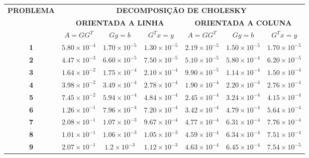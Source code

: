 \documentclass[a4paper,11pt]{article}
\begin{document}
\begin{table}[h]
\begin{tabular}{|c|c|c|c|c|c|c|}
\hline
\multirow{3}{*}{\textbf{PROBLEMA}} & \multicolumn{6}{c|}{\textbf{DECOMPOSIÇÃO DE CHOLESKY}}                                             \\ \cline{2-7} 
                                   & \multicolumn{3}{c|}{\textbf{ORIENTADA A LINHA}} & \multicolumn{3}{c|}{\textbf{ORIENTADA A COLUNA}} \\ \cline{2-7} 
                                   & \textbf{$A=GG^T$}      & \textbf{$Gy=b$}      & \textbf{$G^Tx=y$}     & \textbf{$A=GG^T$}      & \textbf{$Gy=b$}      & \textbf{$G^Tx=y$}      \\ \hline
\textbf{1}                         & $5.80\times10^{-4}$ & $1.70\times10^{-5}$ & $1.30\times10^{-5}$ & $2.19\times10^{-5}$ & $1.50\times10^{-5}$ & $1.70\times10^{-5}$  \\ \hline
\textbf{2}                         & $4.47\times10^{-3}$ & $6.60\times10^{-5}$ & $7.50\times10^{-5}$ & $5.10\times10^{-5}$ & $5.80\times10^{-4}$ & $6.20\times10^{-5}$  \\ \hline
\textbf{3}                         & $1.64\times10^{-2}$ & $1.75\times10^{-4}$ & $2.10\times10^{-4}$ & $9.90\times10^{-5}$ & $1.14\times10^{-4}$ & $1.50\times10^{-4}$  \\ \hline
\textbf{4}                         & $3.98\times10^{-2}$ & $3.49\times10^{-4}$ & $2.78\times10^{-4}$ & $1.90\times10^{-4}$ & $2.20\times10^{-4}$ & $2.76\times10^{-4}$  \\ \hline
\textbf{5}                         & $7.45\times10^{-2}$ & $5.94\times10^{-4}$ & $4.84\times10^{-4}$ & $2.45\times10^{-4}$ & $3.24\times10^{-4}$ & $4.15\times10^{-4}$  \\ \hline
\textbf{6}                         & $1.26\times10^{-1}$ & $7.96\times10^{-4}$ & $7.20\times10^{-4}$ & $3.42\times10^{-4}$ & $4.79\times10^{-4}$ & $5.64\times10^{-4}$  \\ \hline
\textbf{7}                         & $2.08\times10^{-1}$ & $1.07\times10^{-3}$ & $9.67\times10^{-4}$ & $4.77\times10^{-4}$ & $6.31\times10^{-4}$ & $7.76\times10^{-4}$  \\ \hline
\textbf{8}                         & $1.01\times10^{-1}$ & $1.06\times10^{-3}$ & $1.05\times10^{-3}$ & $4.59\times10^{-4}$ & $6.34\times10^{-4}$ & $7.51\times10^{-4}$  \\ \hline
\textbf{9}                         & $2.07\times10^{-1}$ & $1.2\times10^{-3}$ & $1.12\times10^{-3}$ & $4.63\times10^{-4}$ & $6.45\times10^{-4}$ & $7.54\times10^{-5}$  \\ \hline
\end{tabular}
\end{table}
\end{document}
